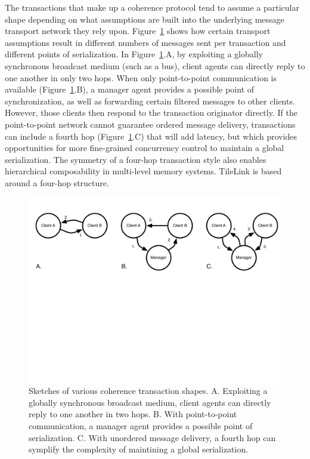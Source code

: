 The transactions that make up a coherence protocol tend to assume a particular shape depending on what
assumptions are built into the underlying message transport network they rely upon.
Figure~\ref{fig:hops} shows how certain transport assumptions result in different numbers of messages sent per transaction and different points of serialization.
In Figure~\ref{fig:hops}.A, by exploiting a globally synchronous broadcast medium (such as a bus), client agents can directly reply to one another in only two hops.
When only point-to-point communication is available (Figure~\ref{fig:hops}.B), a manager agent provides a possible point of synchronization, as well as forwarding certain filtered messages to other clients.
However, those clients then respond to the transaction originator directly.
If the point-to-point network cannot guarantee ordered message delivery, transactions can include a fourth hop (Figure~\ref{fig:hops}.C)
that will add latency, but which provides opportunities for more fine-grained concurrency control to maintain a global serialization.
The symmetry of a four-hop transaction style also enables hierarchical composability in multi-level memory systems.
TileLink is based around a four-hop structure.

\begin{figure}[t!]
\centering
\includegraphics[width=1\columnwidth]{tilelink/figures/hops.pdf}
\caption[Sketches of various coherence transaction shapes.]{
Sketches of various coherence transaction shapes.
A. Exploiting a globally synchronous broadcast medium, client agents can directly reply to one another in two hops.
B. With point-to-point communication, a manager agent provides a possible point of serialization.
C. With unordered message delivery, a fourth hop can symplify the complexity of maintining a global serialization.
}
\label{fig:hops}
\end{figure}

